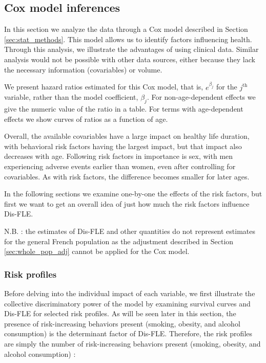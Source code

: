 \documentclass[risks,article,submit,moreauthors,pdftex]{Definitions/mdpi}
\begin{document}
\hypertarget{cox-model-inferences}{%
\subsection{\texorpdfstring{Cox model inferences
\label{sec:cox}}{Cox model inferences }}\label{cox-model-inferences}}

In this section we analyze the data through a Cox model described in
Section \ref{sec:stat_methods}. This model allows us to identify factors
influencing health. Through this analysis, we illustrate the advantages
of using clinical data. Similar analysis would not be possible with
other data sources, either because they lack the necessary information
(covariables) or volume.

We present hazard ratios estimated for this Cox model, that is,
\(e^{\beta_j}\) for the \(j^\text{th}\) variable, rather than the model
coefficient, \(\beta_j\). For non-age-dependent effects we give the
numeric value of the ratio in a table. For terms with age-dependent
effects we show curves of ratios as a function of age.

Overall, the available covariables have a large impact on healthy life
duration, with behavioral risk factors having the largest impact, but
that impact also decreases with age. Following risk factors in
importance is sex, with men experiencing adverse events earlier than
women, even after controlling for covariables. As with risk factors, the
difference becomes smaller for later ages.

In the following sections we examine one-by-one the effects of the risk
factors, but first we want to get an overall idea of just how much the
risk factors influence Dis-FLE.

N.B. : the estimates of Dis-FLE and other quantities do not represent
estimates for the general French population as the adjustment described
in Section \ref{sec:whole_pop_adj} cannot be applied for the Cox model.

\hypertarget{risk-profiles}{%
\subsubsection{Risk profiles}\label{risk-profiles}}

Before delving into the individual impact of each variable, we first
illustrate the collective discriminatory power of the model by examining
survival curves and Dis-FLE for selected risk profiles. As will be seen
later in this section, the presence of risk-increasing behaviors present
(smoking, obesity, and alcohol consumption) is the determinant factor of
Dis-FLE. Therefore, the risk profiles are simply the number of
risk-increasing behaviors present (smoking, obesity, and alcohol
consumption) :
\end{document}
